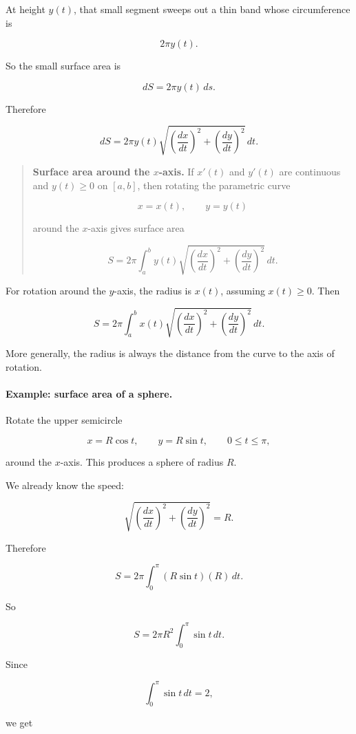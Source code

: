 At height \(y(t)\), that small segment sweeps out a thin band whose circumference is

\[
2\pi y(t).
\]

So the small surface area is

\[
dS
=
2\pi y(t)\,ds.
\]

Therefore

\[
dS
=
2\pi y(t)
\sqrt{\left(\frac{dx}{dt}\right)^2+
      \left(\frac{dy}{dt}\right)^2}\,dt.
\]

\begin{quote}
\textbf{Surface area around the \(x\)-axis.}
If \(x'(t)\) and \(y'(t)\) are continuous and \(y(t)\ge0\) on \([a,b]\), then rotating the
parametric curve

\[
x=x(t),
\qquad
y=y(t)
\]

around the \(x\)-axis gives surface area

\[
\boxed{
S=
2\pi\int_a^b
y(t)
\sqrt{\left(\frac{dx}{dt}\right)^2+
      \left(\frac{dy}{dt}\right)^2}\,dt.
}
\]
\end{quote}

For rotation around the \(y\)-axis, the radius is \(x(t)\), assuming \(x(t)\ge0\).  Then

\[
\boxed{
S=
2\pi\int_a^b
x(t)
\sqrt{\left(\frac{dx}{dt}\right)^2+
      \left(\frac{dy}{dt}\right)^2}\,dt.
}
\]

More generally, the radius is always the distance from the curve to the axis of rotation.

\paragraph{Example: surface area of a sphere.}
Rotate the upper semicircle

\[
x=R\cos t,
\qquad
y=R\sin t,
\qquad
0\le t\le\pi,
\]

around the \(x\)-axis.  This produces a sphere of radius \(R\).

We already know the speed:

\[
\sqrt{\left(\frac{dx}{dt}\right)^2+
      \left(\frac{dy}{dt}\right)^2}
=
R.
\]

Therefore

\[
S=
2\pi\int_0^\pi (R\sin t)(R)\,dt.
\]

So

\[
S=2\pi R^2\int_0^\pi \sin t\,dt.
\]

Since

\[
\int_0^\pi \sin t\,dt=2,
\]

we get

